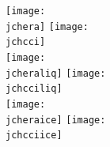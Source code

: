\begin{figure}[!ht]
  \centering
  \texttt{[image: \\jchera]} 
  \texttt{[image: \\jchcci]} \\
  \texttt{[image: \\jcheraliq]}
  \texttt{[image: \\jchcciliq]} \\
  \texttt{[image: \\jcheraice]}
  \texttt{[image: \\jchcciice]} 
  \caption[Joint cloud proptery histograms.]{\jchcaption}
  \label{fig:jch}
\end{figure}


